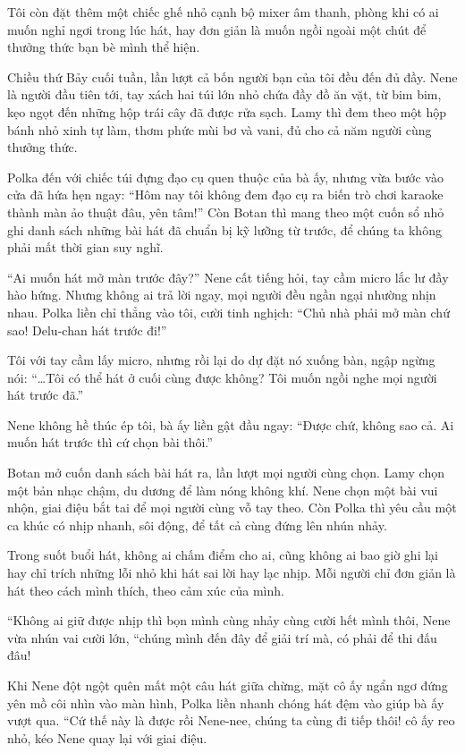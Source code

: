 \documentclass[../main.tex]{subfiles}
\begin{document}
Tôi còn đặt thêm một chiếc ghế nhỏ cạnh bộ mixer âm thanh, phòng khi có ai muốn nghỉ ngơi trong lúc hát, hay đơn giản là muốn ngồi ngoài một chút để thưởng thức bạn bè mình thể hiện.

\ct

Chiều thứ Bảy cuối tuần, lần lượt cả bốn người bạn của tôi đều đến đủ đầy. Nene là người đầu tiên tới, tay xách hai túi lớn nhỏ chứa đầy đồ ăn vặt, từ bim bim, kẹo ngọt đến những hộp trái cây đã được rửa sạch. Lamy thì đem theo một hộp bánh nhỏ xinh tự làm, thơm phức mùi bơ và vani, đủ cho cả năm người cùng thưởng thức.

Polka đến với chiếc túi đựng đạo cụ quen thuộc của bà ấy, nhưng vừa bước vào cửa đã hứa hẹn ngay: ``Hôm nay tôi không đem đạo cụ ra biến trò chơi karaoke thành màn ảo thuật đâu, yên tâm!'' Còn Botan thì mang theo một cuốn sổ nhỏ ghi danh sách những bài hát đã chuẩn bị kỹ lưỡng từ trước, để chúng ta không phải mất thời gian suy nghĩ.

``Ai muốn hát mở màn trước đây?'' Nene cất tiếng hỏi, tay cầm micro lắc lư đầy hào hứng. Nhưng không ai trả lời ngay, mọi người đều ngần ngại nhường nhịn nhau. Polka liền chỉ thẳng vào tôi, cười tinh nghịch: ``Chủ nhà phải mở màn chứ sao! Delu-chan hát trước đi!''

Tôi với tay cầm lấy micro, nhưng rồi lại do dự đặt nó xuống bàn, ngập ngừng nói: ``\dots Tôi có thể hát ở cuối cùng được không? Tôi muốn ngồi nghe mọi người hát trước đã.''

Nene không hề thúc ép tôi, bà ấy liền gật đầu ngay: ``Được chứ, không sao cả. Ai muốn hát trước thì cứ chọn bài thôi.''

Botan mở cuốn danh sách bài hát ra, lần lượt mọi người cùng chọn. Lamy chọn một bản nhạc chậm, du dương để làm nóng không khí. Nene chọn một bài vui nhộn, giai điệu bắt tai để mọi người cùng vỗ tay theo. Còn Polka thì yêu cầu một ca khúc có nhịp nhanh, sôi động, để tất cả cùng đứng lên nhún nhảy.

Trong suốt buổi hát, không ai chấm điểm cho ai, cũng không ai bao giờ ghi lại hay chỉ trích những lỗi nhỏ khi hát sai lời hay lạc nhịp. Mỗi người chỉ đơn giản là hát theo cách mình thích, theo cảm xúc của mình.

``Không ai giữ được nhịp thì bọn mình cùng nhảy cùng cười hết mình thôi, Nene vừa nhún vai cười lớn, ``chúng mình đến đây để giải trí mà, có phải để thi đấu đâu!

Khi Nene đột ngột quên mất một câu hát giữa chừng, mặt cô ấy ngẩn ngơ đứng yên mồ côi nhìn vào màn hình, Polka liền nhanh chóng hát đệm vào giúp bà ấy vượt qua. ``Cứ thế này là được rồi Nene-nee, chúng ta cùng đi tiếp thôi! cô ấy reo nhỏ, kéo Nene quay lại với giai điệu.
\end{document}
